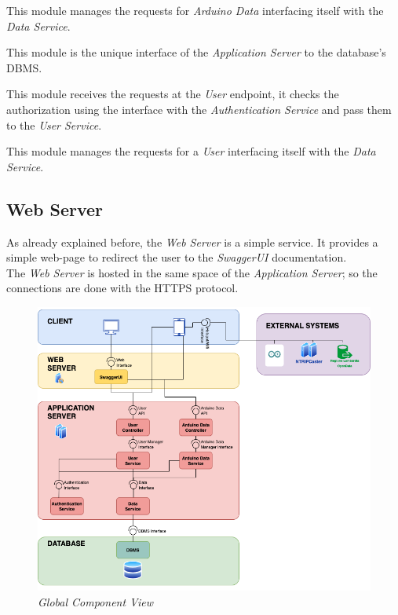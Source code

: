 This module manages the requests for \textit{Arduino Data} interfacing itself with the \textit{Data Service}.

This module is the unique interface of the \textit{Application Server} to the database's DBMS.

This module receives the requests at the \textit{User} endpoint, it checks the authorization using the interface with the \textit{Authentication Service} and pass them to the \textit{User Service}.

This module manages the requests for a \textit{User} interfacing itself with the \textit{Data Service}.

\clearpage
\subsection{Web Server}
As already explained before, the \textit{Web Server} is a simple service. It provides a simple web-page to redirect the user to the \textit{SwaggerUI} documentation.\\
The \textit{Web Server} is hosted in the same space of the \textit{Application Server}; so the connections are done with the HTTPS protocol.\\

\begin{figure}[H]
\begin{center}
  \includegraphics[width=\textwidth]{img/archi/components.png}
  \hspace{0.05\linewidth}
  \centering
  \caption{\textit{Global Component View}}
  \label{img:archi_components}
\end{center}
\end{figure}

